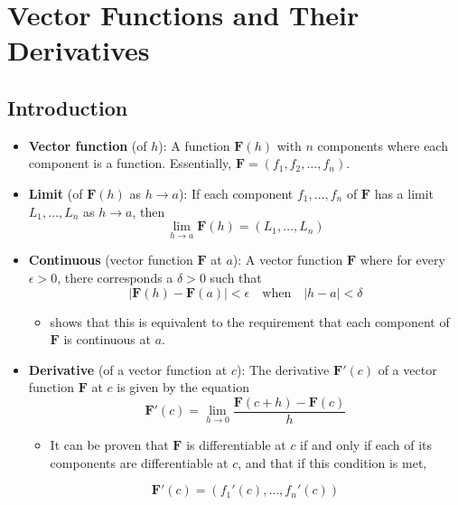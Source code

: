 \documentclass[../main.tex]{subfiles}
\begin{document}
\chapter{Vector Functions and Their Derivatives}
\section{Introduction}
\begin{itemize}
    \item {}\textbf{Vector function} (of $h$): A function $\textbf{F}(h)$ with $n$ components where each component is a function. Essentially, $\textbf{F}=(f_1,f_2,\dots,f_n)$.
    \item \textbf{Limit} (of $\textbf{F}(h)$ as $h\to a$): If each component $f_1,\dots,f_n$ of $\textbf{F}$ has a limit $L_1,\dots,L_n$ as $h\to a$, then
    \begin{equation*}
        \lim_{h\to a}\textbf{F}(h) = (L_1,\dots,L_n)
    \end{equation*}
    \item \textbf{Continuous} (vector function $\textbf{F}$ at $a$): A vector function $\textbf{F}$ where for every $\epsilon>0$, there corresponds a $\delta>0$ such that
    \begin{equation*}
        |\textbf{F}(h)-\textbf{F}(a)|<\epsilon\quad\text{when}\quad|h-a|<\delta
    \end{equation*}
    \begin{itemize}
        \item \cite{bib:Thomas} shows that this is equivalent to the requirement that each component of $\textbf{F}$ is continuous at $a$.
    \end{itemize}
    \item \textbf{Derivative} (of a vector function at $c$): The derivative $\textbf{F}'(c)$ of a vector function $\textbf{F}$ at $c$ is given by the equation
    \begin{equation*}
        \textbf{F}'(c) = \lim_{h\to 0}\frac{\textbf{F}(c+h)-\textbf{F}(c)}{h}
    \end{equation*}
    \begin{itemize}
        \item It can be proven that $\textbf{F}$ is differentiable at $c$ if and only if each of its components are differentiable at $c$, and that if this condition is met,
    \end{itemize}
    \begin{equation*}
        \textbf{F}'(c) = (f_1'(c),\dots,f_n'(c))
    \end{equation*}
\end{itemize}
\end{document}
